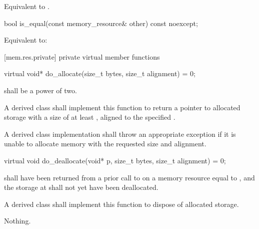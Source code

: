\begin{itemdescr}
\pnum
\effects
Equivalent to .
\end{itemdescr}

%
\begin{itemdecl}
bool is_equal(const memory_resource& other) const noexcept;
\end{itemdecl}

\begin{itemdescr}
\pnum
\effects
Equivalent to: 
\end{itemdescr}


[mem.res.private]{ private virtual member functions}

%
\begin{itemdecl}
virtual void* do_allocate(size_t bytes, size_t alignment) = 0;
\end{itemdecl}

\begin{itemdescr}
\pnum
\requires
{} shall be a power of two.

\pnum
\returns
A derived class shall implement this function to
return a pointer to allocated storage
with a size of at least ,
aligned to the specified .

\pnum
\throws
A derived class implementation shall throw an appropriate exception if it is unable to allocate memory with the requested size and alignment.
\end{itemdescr}

%
\begin{itemdecl}
virtual void do_deallocate(void* p, size_t bytes, size_t alignment) = 0;
\end{itemdecl}

\begin{itemdescr}
\pnum
\requires
{} shall have been returned from a prior call to  on a memory resource equal to ,
and the storage at  shall not yet have been deallocated.

\pnum
\effects
A derived class shall implement this function to dispose of allocated storage.

\pnum
\throws
Nothing.
\end{itemdescr}

